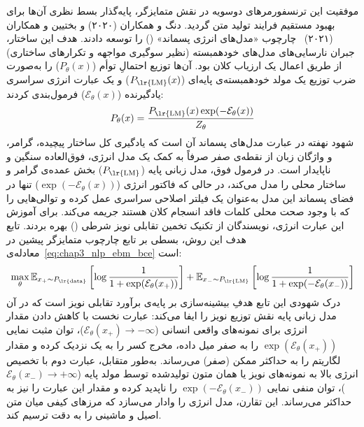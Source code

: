 موفقیت این ترنسفورمرهای دوسویه در نقش متمایزگر، پایه‌گذار بسط نظری آن‌ها برای بهبود مستقیم فرایند تولید متن گردید. دنگ و همکاران (۲۰۲۰) و بختیین و همکاران (۲۰۲۱)~\cite{deng2020residual, bakhtin2021residual} چارچوب «مدل‌های انرژی پسماند» () را توسعه دادند. هدف این ساختار، جبران نارسایی‌های مدل‌های خودهمبسته (نظیر سوگیری مواجهه و تکرارهای ساختاری) از طریق اعمال یک ارزیاب کلان بود. آن‌ها توزیع احتمالِ توأم ($P_\theta(x)$) را به‌صورت ضرب توزیع یک مولد خودهمبسته‌ی پایه‌ای ($P_{\text{\lr{LM}}}(x)$) و یک عبارت انرژی سراسری یادگیرنده ($\mathcal{E}_\theta(x)$) فرمول‌بندی کردند:
\begin{equation}\label{eq:chap3_residual_ebm_p}
    P_\theta(x) = \frac{P_{\text{\lr{LM}}}(x) \exp(-\mathcal{E}_\theta(x))}{Z_\theta}
\end{equation}
شهود نهفته در عبارت مدل‌های پسماند آن است که یادگیری کل ساختار پیچیده، گرامر، و واژگان زبان از نقطه‌ی صفر صرفاً به کمک یک مدل انرژی، فوق‌العاده سنگین و ناپایدار است. در فرمول فوق، مدل زبانی پایه ($P_{\text{\lr{LM}}}$) بخش عمده‌ی گرامر و ساختار محلی را مدل می‌کند، در حالی که فاکتور انرژی ($\exp(-\mathcal{E}_\theta(x))$) تنها در فضای پسماند این مدل به‌عنوان یک فیلتر اصلاحی سراسری عمل کرده و توالی‌هایی را که با وجود صحت محلی کلمات فاقد انسجام کلان هستند جریمه می‌کند. برای آموزش این عبارت انرژی، نویسندگان از تکنیک تخمین تقابلی نویز شرطی () بهره بردند. تابع هدف این روش، بسطی بر تابع  چارچوب متمایزگر پیشین در معادله‌ی~\ref{eq:chap3_nlp_ebm_bce} است:
\begin{equation}\label{eq:chap3_residual_ebm_cnce}
    \max_\theta \mathbb{E}_{x_+ \sim P_{\text{\lr{data}}}} \left[ \log \frac{1}{1 + \exp(\mathcal{E}_\theta(x_+))} \right] + \mathbb{E}_{x_- \sim P_{\text{\lr{LM}}}} \left[ \log \frac{1}{1 + \exp(-\mathcal{E}_\theta(x_-))} \right]
\end{equation}
درک شهودی این تابع هدفِ بیشینه‌سازی بر پایه‌ی برآورد تقابلی نویز است که در آن مدل زبانی پایه نقش توزیع نویز را ایفا می‌کند:
عبارت نخست با کاهش دادن مقدار انرژی برای نمونه‌های واقعی انسانی ($\mathcal{E}_\theta(x_+) \to -\infty$)، توان مثبت نمایی $\exp(\mathcal{E}_\theta(x_+))$ را به صفر میل داده، مخرج کسر را به یک نزدیک کرده و مقدار لگاریتم را به حداکثر ممکن (صفر) می‌رساند.
به‌طور متقابل، عبارت دوم با تخصیص انرژی بالا به نمونه‌های نویز یا همان متون تولیدشده توسط مولد پایه ($\mathcal{E}_\theta(x_-) \to +\infty$)، توان منفی نمایی $\exp(-\mathcal{E}_\theta(x_-))$ را ناپدید کرده و مقدار این عبارت را نیز به حداکثر می‌رساند. این تقارن، مدل انرژی را وادار می‌سازد که مرزهای کیفی میان متن اصیل و ماشینی را به دقت ترسیم کند.

